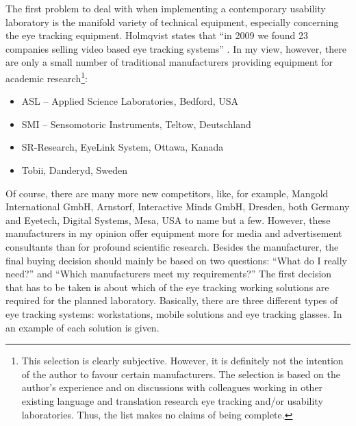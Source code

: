 \documentclass[output=paper]{langsci/langscibook}
\begin{document}
The first problem to deal with when implementing a contemporary usability laboratory is the manifold variety of technical equipment, especially concerning the eye tracking equipment. Holmqvist states that ``in 2009 we found 23 companies selling video based eye tracking systems'' \citep[12]{Holmqvist2011}. In my view, however, there are only a small number of traditional manufacturers providing equipment for academic research\footnote{ This selection is clearly subjective. However, it is definitely not the intention of the author to favour certain manufacturers. The selection is based on the author's experience and on discussions with colleagues working in other existing language and translation research eye tracking and/or usability laboratories. Thus, the list makes no claims of being complete.}: 

\begin{itemize}
\item ASL -- Applied Science Laboratories, Bedford, USA
\item SMI -- Sensomotoric Instruments, Teltow, Deutschland
\item SR-Research, EyeLink System, Ottawa, Kanada
\item Tobii, Danderyd, Sweden 
\end{itemize}


Of course, there are many more new competitors, like, for example, Mangold International GmbH, Arnstorf, Interactive Minds GmbH, Dresden, both Germany and Eyetech, Digital Systems, Mesa, USA to name but a few. However, these manufacturers in my opinion offer equipment more for media and advertisement consultants than for profound scientific research. Besides the manufacturer, the final buying decision should mainly be based on two questions: ``What do I really need?'' and ``Which manufacturers meet my requirements?'' The first decision that has to be taken is about which of the eye tracking working solutions are required for the planned laboratory. Basically, there are three different types of eye tracking systems: workstations, mobile solutions and eye tracking glasses. In  an example of each solution is given.
\end{document}
